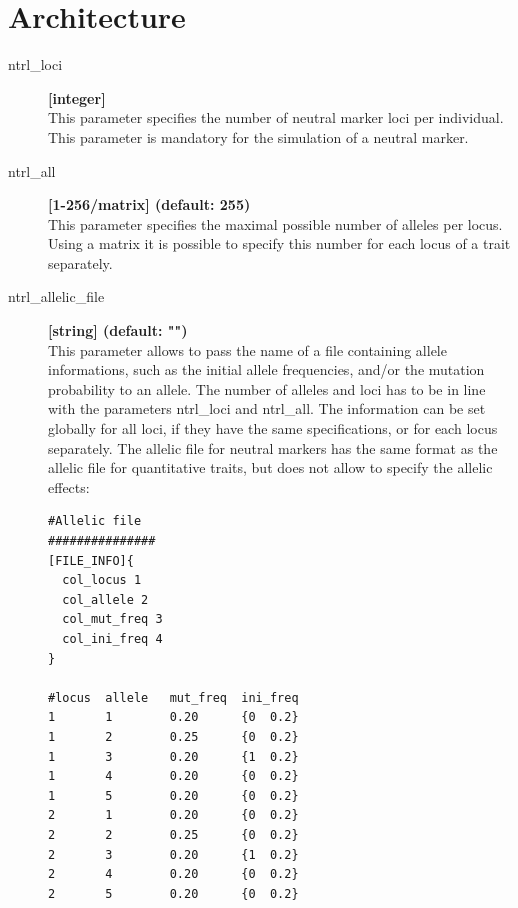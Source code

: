 \documentclass[letterpaper,12pt,oneside]{book}
\begin{document}
\section{Architecture}
\begin{description}
\item[ntrl\_loci] \textbf{[integer]}\\
This parameter specifies the number of neutral marker loci per individual. This parameter is mandatory for the simulation of a neutral marker.

\item[ntrl\_all] \textbf{[1-256/matrix] (default: 255)}\\
This parameter specifies the maximal possible number of alleles per locus. Using a matrix it is possible to specify this number for each locus of a trait separately.

\item[\label{allelicFileNTRL}ntrl\_allelic\_file]  \textbf{[string] (default: "")} \\
This parameter allows to pass the name of a file containing allele informations, such as the initial allele frequencies, and/or the mutation probability to an allele. The number of alleles and loci has to be in line with the parameters \textsf{ntrl\_loci} and \textsf{ntrl\_all}. The information can be set globally for all loci, if they have the same specifications, or for each locus separately. The allelic file for neutral markers has the same format as the allelic file for quantitative traits, but does not allow to specify the allelic effects:

\begin{lstlisting}[frame=single]
#Allelic file 
###############
[FILE_INFO]{
  col_locus 1
  col_allele 2
  col_mut_freq 3
  col_ini_freq 4
}

#locus  allele   mut_freq  ini_freq  
1       1        0.20      {0  0.2}
1       2        0.25      {0  0.2}
1       3        0.20      {1  0.2}
1       4        0.20      {0  0.2}
1       5        0.20      {0  0.2}
2       1        0.20      {0  0.2}
2       2        0.25      {0  0.2}
2       3        0.20      {1  0.2}
2       4        0.20      {0  0.2}
2       5        0.20      {0  0.2}
\end{lstlisting}


\end{description}
\end{document}
